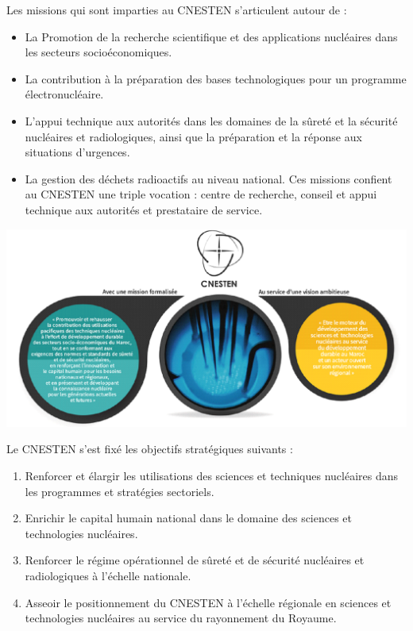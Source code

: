 \documentclass{report}
\newenvironment{mystyle}{
	\setlength{\parindent}{0pt} %
	\setlength{\parskip}{10pt} %
	\fontsize{12pt}{14pt}\selectfont %
}{
}
\begin{document}
	\begin{mystyle}
		Les missions qui sont imparties au CNESTEN s’articulent autour de : 
		\begin{itemize}
			\item La Promotion de la recherche scientifique et des applications nucléaires dans les secteurs socioéconomiques.
			
			\item La contribution à la préparation des bases technologiques pour un programme électronucléaire.
			\item  L’appui technique aux autorités dans les domaines de la sûreté et la sécurité nucléaires et radiologiques, ainsi que la préparation et la réponse aux situations d’urgences.
			
			\item La gestion des déchets radioactifs au niveau national. Ces missions confient au CNESTEN une triple vocation : centre de recherche, conseil et appui technique aux autorités et prestataire de service.

		\end{itemize}
		
		\begin{center} %
			\includegraphics[width=1\textwidth]{triplet.png} 
		\end{center}
		Le CNESTEN s’est fixé les objectifs stratégiques suivants :
		
		\begin{enumerate}
			\item Renforcer et élargir les utilisations des sciences et techniques nucléaires dans les programmes et stratégies sectoriels. 
			
			\item Enrichir le capital humain national dans le domaine des sciences et technologies nucléaires.
			\item Renforcer le régime opérationnel de sûreté et de sécurité nucléaires et radiologiques à l’échelle nationale.
			\item Asseoir le positionnement du CNESTEN à l’échelle régionale en sciences et technologies nucléaires au service du rayonnement du Royaume.
		\end{enumerate}
	\end{mystyle}
	
\end{document}
